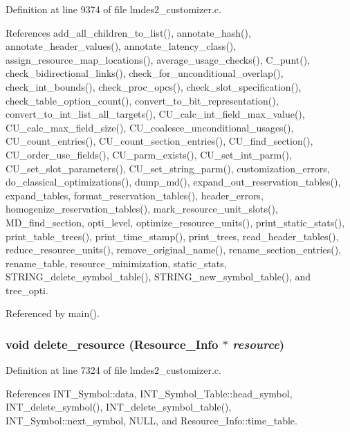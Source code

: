 Definition at line 9374 of file lmdes2\_\-customizer.c.

References add\_\-all\_\-children\_\-to\_\-list(), annotate\_\-hash(), annotate\_\-header\_\-values(), annotate\_\-latency\_\-class(), assign\_\-resource\_\-map\_\-locations(), average\_\-usage\_\-checks(), C\_\-punt(), check\_\-bidirectional\_\-links(), check\_\-for\_\-unconditional\_\-overlap(), check\_\-int\_\-bounds(), check\_\-proc\_\-opcs(), check\_\-slot\_\-specification(), check\_\-table\_\-option\_\-count(), convert\_\-to\_\-bit\_\-representation(), convert\_\-to\_\-int\_\-list\_\-all\_\-targets(), CU\_\-calc\_\-int\_\-field\_\-max\_\-value(), CU\_\-calc\_\-max\_\-field\_\-size(), CU\_\-coalesce\_\-unconditional\_\-usages(), CU\_\-count\_\-entries(), CU\_\-count\_\-section\_\-entries(), CU\_\-find\_\-section(), CU\_\-order\_\-use\_\-fields(), CU\_\-parm\_\-exists(), CU\_\-set\_\-int\_\-parm(), CU\_\-set\_\-slot\_\-parameters(), CU\_\-set\_\-string\_\-parm(), customization\_\-errors, do\_\-classical\_\-optimizations(), dump\_\-md(), expand\_\-out\_\-reservation\_\-tables(), expand\_\-tables, format\_\-reservation\_\-tables(), header\_\-errors, homogenize\_\-reservation\_\-tables(), mark\_\-resource\_\-unit\_\-slots(), MD\_\-find\_\-section, opti\_\-level, optimize\_\-resource\_\-units(), print\_\-static\_\-stats(), print\_\-table\_\-trees(), print\_\-time\_\-stamp(), print\_\-trees, read\_\-header\_\-tables(), reduce\_\-resource\_\-units(), remove\_\-original\_\-name(), rename\_\-section\_\-entries(), rename\_\-table, resource\_\-minimization, static\_\-stats, STRING\_\-delete\_\-symbol\_\-table(), STRING\_\-new\_\-symbol\_\-table(), and tree\_\-opti.

Referenced by main().
\subsubsection{\setlength{\rightskip}{0pt plus 5cm}void delete\_\-resource (\bf{Resource\_\-Info} $\ast$ {\em resource})}\label{lmdes2__customizer_8c_bfdef3d3f07e9a7c115420edfd247755}




Definition at line 7324 of file lmdes2\_\-customizer.c.

References INT\_\-Symbol::data, INT\_\-Symbol\_\-Table::head\_\-symbol, INT\_\-delete\_\-symbol(), INT\_\-delete\_\-symbol\_\-table(), INT\_\-Symbol::next\_\-symbol, NULL, and Resource\_\-Info::time\_\-table.

